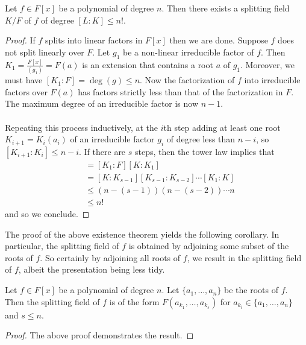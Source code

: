 \documentclass[a4paper]{article}
\begin{document}
\begin{thm}{}{} Let $f\in F[x]$ be a polynomial of degree $n$. Then there exists a splitting field $K/F$ of $f$ of degree $[L:K]\leq n!$. \tcbline
\begin{proof}
If $f$ splits into linear factors in $F[x]$ then we are done. Suppose $f$ does not split linearly over $F$. Let $g_1$ be a non-linear irreducible factor of $f$. Then $K_1=\frac{F[x]}{(g_1)}=F(a)$ is an extension that contains a root $a$ of $g_1$. Moreover, we must have $[K_1:F]=\deg(g)\leq n$. Now the factorization of $f$ into irreducible factors over $F(a)$ has factors strictly less than that of the factorization in $F$. The maximum degree of an irreducible factor is now $n-1$. \\~\\

Repeating this process inductively, at the $i$th step adding at least one root $K_{i+1}=K_i(a_i)$ of an irreducible factor $g_i$ of degree less than $n-i$, so $[K_{i+1}:K_i]\leq n-i$. If there are $s$ steps, then the tower law implies that 
\begin{align*}
[K:F]&=[K_1:F][K:K_1]\\
&=[K:K_{s-1}][K_{s-1}:K_{s-2}]\cdots[K_1:K]\\
&\leq (n-(s-1))(n-(s-2))\cdots n\\
&\leq n!
\end{align*}
and so we conclude. 
\end{proof}
\end{thm}

The proof of the above existence theorem yields the following corollary. In particular, the splitting field of $f$ is obtained by adjoining some subset of the roots of $f$. So certainly by adjoining all roots of $f$, we result in the splitting field of $f$, albeit the presentation being less tidy. 

\begin{crl}{}{} Let $f\in F[x]$ be a polynomial of degree $n$. Let $\{a_1,\dots,a_n\}$ be the roots of $f$. Then the splitting field of $f$ is of the form $F(a_{k_1},\dots,a_{k_s})$ for $a_{k_i}\in\{a_1,\dots,a_n\}$ and $s\leq n$. \tcbline
\begin{proof}
The above proof demonstrates the result. 
\end{proof}
\end{crl}
\end{document}
